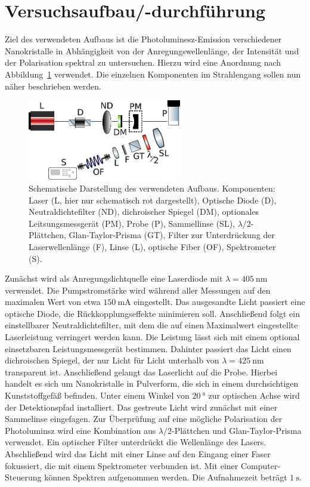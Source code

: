 \section{Versuchsaufbau/-durchführung}
\label{sec:durchfuehrung}
Ziel des verwendeten Aufbaus ist die Photoluminesz-Emission verschiedener Nanokristalle in Abhängigkeit
von der Anregungswellenlänge, der Intensität und der Polarisation spektral zu untersuchen.
Hierzu wird eine Anordnung nach Abbildung~\ref{fig: aufbau} verwendet. Die einzelnen Komponenten
im Strahlengang sollen nun näher beschrieben werden.

\begin{figure}
  \centering
  \includegraphics[width = 0.6\textwidth]{pics/setup.pdf}
  \caption{Schematische Darstellung des verwendeten Aufbaus. Komponenten: Laser (L, hier nur schematisch rot dargestellt), Optische Diode (D), Neutraldichtefilter (ND),
  dichroischer Spiegel (DM), optionales Leitsungsmessgerät (PM), Probe (P), Sammellinse (SL), $\lambda / 2$-Plättchen, Glan-Taylor-Prisma (GT), Filter zur Unterdrückung
  der Laserwellenlänge (F), Linse (L), optische Fiber (OF), Spektrometer (S).}
  \label{fig: aufbau}
\end{figure}

Zunächst wird als Anregungslichtquelle eine Laserdiode mit $\lambda = \SI{405}{\nano\meter}$ verwendet.
Die Pumpstromstärke wird während aller Messungen auf den maximalen Wert von etwa $\SI{150}{\milli\ampere}$ eingestellt.
Das ausgesandte Licht passiert eine optische Diode, die Rückkopplungseffekte minimieren soll.
Anschließend folgt ein einstellbarer Neutraldichtefilter, mit dem die auf einen Maximalwert eingestellte Laserleistung
verringert werden kann. Die Leistung lässt sich mit einem optional einsetzbaren Leistungsmessgerät bestimmen.
Dahinter passiert das Licht einen
dichroischen Spiegel, der nur Licht für Licht unterhalb von
$\lambda = \SI{425}{\nano\meter}$ transparent ist.
Anschließend gelangt das Laserlicht auf die Probe. Hierbei handelt es sich um Nanokristalle in Pulverform, die sich in
einem durchsichtigen Kunststoffgefäß befinden. Unter einem Winkel von $\SI{20}{\degree}$ zur optischen Achse wird der
Detektionspfad installiert. Das gestreute Licht wird zunächst mit einer Sammelinse eingefagen. Zur Überprüfung auf eine
mögliche Polarisation der Photoluminsz wird eine Kombination aus $\lambda / 2$-Plättchen und
Glan-Taylor-Prisma verwendet. Ein optischer Filter unterdrückt die Wellenlänge des Lasers.
Abschließend wird das Licht mit einer Linse auf den Eingang einer Faser fokussiert, die mit einem
Spektrometer verbunden ist. Mit einer Computer-Steuerung können Spektren aufgenommen werden. Die Aufnahmezeit beträgt
$\SI{1}{\second}$.

